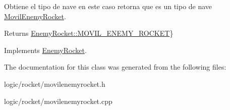 Obtiene el tipo de nave en este caso retorna que es un tipo de nave \hyperlink{class_movil_enemy_rocket}{Movil\-Enemy\-Rocket}. 

\begin{DoxyReturn}{Returns}
\hyperlink{class_enemy_rocket_a62103a6d3bc8dd2860b91d5250113281}{Enemy\-Rocket\-::\-M\-O\-V\-I\-L\-\_\-\-E\-N\-E\-M\-Y\-\_\-\-R\-O\-C\-K\-E\-T}\} 
\end{DoxyReturn}


Implements \hyperlink{class_enemy_rocket_a44e857f29c0846545743e21638391527}{Enemy\-Rocket}.



The documentation for this class was generated from the following files\-:\begin{DoxyCompactItemize}
\item 
logic/rocket/movilenemyrocket.\-h\item 
logic/rocket/movilenemyrocket.\-cpp\end{DoxyCompactItemize}
